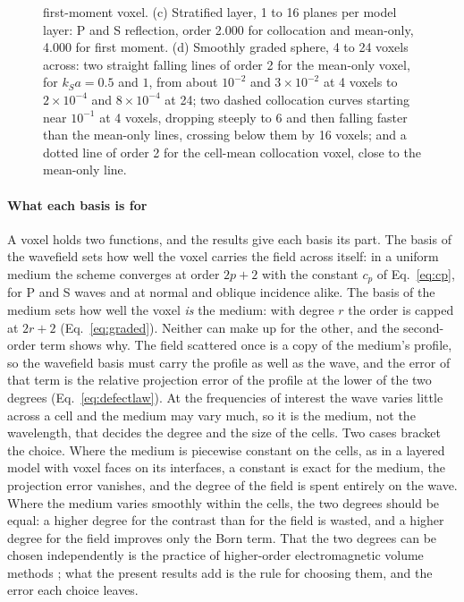 \documentclass[preprint,review,12pt]{elsarticle}
\begin{document}
\begin{figure}[t]
{first-moment voxel. (c) Stratified layer, 1 to 16 planes per model layer: P and S reflection, order 2.000
for collocation and mean-only, 4.000 for first moment. (d) Smoothly graded sphere, 4 to 24 voxels across:
two straight falling lines of order 2 for the mean-only voxel, for $k_Sa=0.5$ and $1$, from about
$10^{-2}$ and $3\times10^{-2}$ at 4 voxels to $2\times10^{-4}$ and $8\times10^{-4}$ at 24; two
dashed collocation curves starting near $10^{-1}$ at 4 voxels, dropping steeply to 6 and then
falling faster than the mean-only lines, crossing below them by 16 voxels; and a dotted line of order
2 for the cell-mean collocation voxel, close to the mean-only line.\par}
\end{figure}

\paragraph{What each basis is for} A voxel holds two functions, and the results give each basis its
part. The basis of the wavefield sets how well the voxel carries the field across itself: in a uniform
medium the scheme converges at order $2p+2$ with the constant $c_p$ of Eq.~\eqref{eq:cp}, for P and S
waves and at normal and oblique incidence alike. The basis of the medium sets how well the voxel
\emph{is} the medium: with degree $r$ the order is capped at $2r+2$ (Eq.~\eqref{eq:graded}). Neither can
make up for the other, and the second-order term shows why. The field scattered once is a copy of the
medium's profile, so the wavefield basis must carry the profile as well as the wave, and the error of
that term is the relative projection error of the profile at the lower of the two degrees
(Eq.~\eqref{eq:defectlaw}). At the frequencies of interest the wave varies little across a cell and the
medium may vary much, so it is the medium, not the wavelength, that decides the degree and the size of
the cells. Two cases bracket the choice. Where the medium is piecewise constant on the cells, as in a
layered model with voxel faces on its interfaces, a constant is exact for the medium, the projection
error vanishes, and the degree of the field is spent entirely on the wave. Where the medium varies
smoothly within the cells, the two degrees should be equal: a higher degree for the contrast than for
the field is wasted, and a higher degree for the field improves only the Born term. That the two
degrees can be chosen independently is the practice of higher-order electromagnetic volume methods
\citep{Chobanyan2015}; what the present results add is the rule for choosing them, and the error each
choice leaves.
\end{document}
